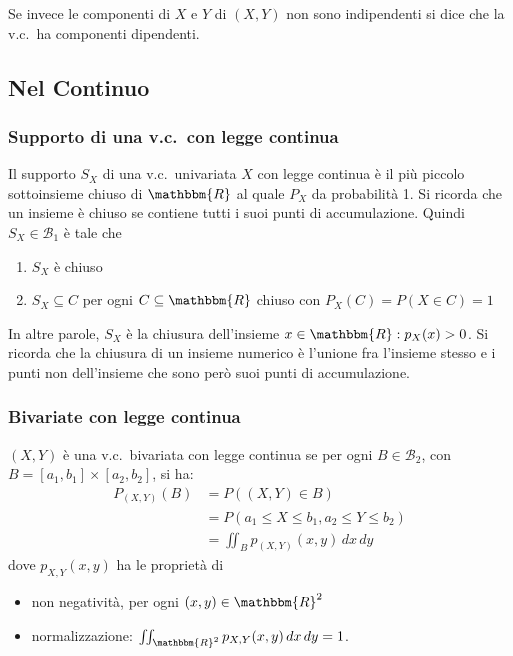 \documentclass[11pt,a4paper,twoside]{article}
\let\leq\leqslant%
\newcommand\R{\mathbbm{R}}
\newcommand\B{\mathcal{B}}
\newcommand\dx{\,dx}
\newcommand\dy{\,dy}
\begin{document}
Se invece le componenti di \(X\) e \(Y\) di \((X,Y)\) non sono
indipendenti si dice che la v.c.\ ha componenti dipendenti.
\subsection{Nel Continuo}

\subsubsection{Supporto di una v.c.\ con legge continua}
Il supporto \(S_X\) di una v.c.\ univariata \(X\) con legge continua è
il più piccolo sottoinsieme chiuso di \(\R\) al quale \(P_X\) da
probabilità 1. Si ricorda che un insieme è chiuso se contiene tutti i
suoi punti di accumulazione.  Quindi \(S_X\in\B_1\) è tale che
\begin{enumerate}
\item \(S_X\) è chiuso
\item \(S_X \subseteq C\) per ogni \(C\subseteq \R\) chiuso con
  \(P_X(C) = P(X\in C) = 1\)
\end{enumerate}

In altre parole, \(S_X\) è la chiusura dell'insieme \({ x\in\R :
  p_X(x) > 0 }\).  Si ricorda che la chiusura di un insieme numerico è
l'unione fra l'insieme stesso e i punti non dell'insieme che sono però
suoi punti di accumulazione.

\subsubsection{Bivariate con legge continua}
\((X,Y)\) è una v.c.\ bivariata con legge continua se per ogni
\(B\in\B_2\), con \(B = [a_1,b_1]\times [a_2,b_2]\), si ha:
\begin{align*}
  P_{(X,Y)}(B) &= P((X,Y)\in B) \\
               &= P(a_1 \leq X \leq b_1, a_2\leq Y\leq b_2) \\
               &= \iint_B p_{(X,Y)}(x,y)\dx\dy
\end{align*}
dove \(p_{X,Y}(x,y)\) ha le proprietà di
\begin{itemize}
\item non negatività, per ogni \((x,y) \in \R^2\)
\item normalizzazione: \(\iint_{\R^2} p_{X,Y}(x,y) \dx\dy = 1\).
\end{itemize}
\end{document}
